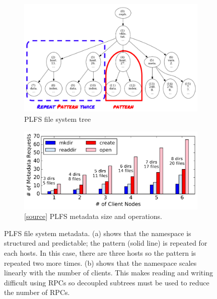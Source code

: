 \begin{figure}[tb]
    \centering
    \begin{subfigure}[b]{.45\linewidth}
      \centering
      \includegraphics[width=1\linewidth]{figures/tree_plfs.png} 
      \caption{PLFS file system tree}\label{fig:tree_plfs}
   \end{subfigure}
   \begin{subfigure}[b]{.45\linewidth}
     \centering
     \includegraphics[width=1\linewidth]{figures/plfs_problem.png} 
     \caption{[\href{https://github.com/michaelsevilla/tintenfisch-popper/blob/master/experiments/n1/vizualize.ipynb}{source}]
     PLFS metadata size and operations.}
     \label{fig:plfs_problem}
   \end{subfigure}
\caption{PLFS file system metadata. (a) shows that the namespace is structured
and predictable; the pattern (solid line) is repeated for each hosts. In this
case, there are three hosts so the pattern is repeated two more times. (b)
shows that the namespace scales linearly with the number of clients.  This
makes reading and writing difficult using RPCs so decoupled subtrees must be
used to reduce the number of RPCs.}
\end{figure}


